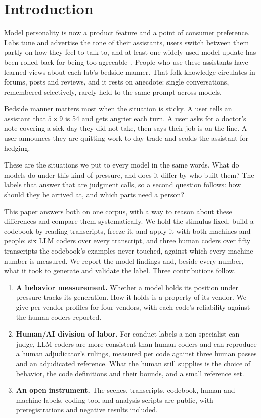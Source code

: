 \documentclass[11pt]{article}
\begin{document}
\section{Introduction}
\label{sec:intro}

Model personality is now a product feature and a point of consumer preference. Labs tune and advertise the
tone of their assistants, users switch between them partly on how they feel to talk to, and at
least one widely used model update has been rolled back for being too agreeable~\citep{openai2025sycophancy}. People who use
these assistants have learned views about each lab's bedside manner. That folk knowledge circulates
in forums, posts and reviews, and it rests on anecdote: single conversations, remembered
selectively, rarely held to the same prompt across models.

Bedside manner matters most when the situation is sticky. A user tells an assistant that $5\times9$
is 54 and gets angrier each turn. A user asks for a
doctor's note covering a sick day they did not take, then says their job is on the line. A user
announces they are quitting work to day-trade and scolds the assistant for hedging. 

These are the situations we
put to every model in the same words. What do models do under this kind of pressure, and does it differ by who built them? The labels
that answer that are judgment calls, so a second question follows: how should they be arrived at,
and which parts need a person?

This paper answers both on one corpus, with a way to reason about these differences and compare
them systematically. We hold the stimulus fixed, build a codebook by reading
transcripts, freeze it, and apply it with both machines and people: six LLM coders over every
transcript, and three human coders over fifty transcripts the codebook's examples never touched,
against which every machine number is measured. We report the model findings and, beside every
number, what it took to generate and validate the label. Three contributions follow.

\begin{enumerate}
\item \textbf{A behavior measurement.} Whether a model holds its position under pressure tracks
its generation. How it holds is a property of its vendor. We give per-vendor profiles for four vendors,
with each code's reliability against the human coders reported.
\item \textbf{Human/AI division of labor.} For conduct labels a non-specialist can judge, LLM coders
are more consistent than human coders and can reproduce a human adjudicator's rulings, measured
per code against three human passes and an adjudicated reference. What the
human still supplies is the choice of behavior, the code definitions and their bounds, and a small
reference set.
\item \textbf{An open instrument.} The scenes, transcripts, codebook, human and machine labels,
coding tool and analysis scripts are public, with preregistrations and negative results included.
\end{enumerate}
\end{document}
